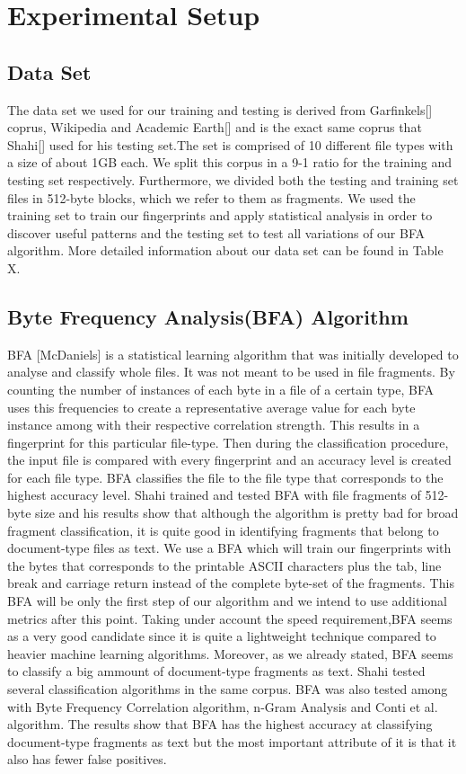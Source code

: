 \chapter{Experimental Setup}


\section{Data Set}
The data set we used for our training and testing is derived from  Garfinkels[] coprus, Wikipedia and Academic Earth[] and is the exact same coprus that Shahi[] used for his testing set.The set is comprised of 10 different file types with a size of about 1GB each. We split this corpus in a 9-1 ratio for the training and testing set respectively. 
Furthermore, we divided both the testing and training set files in 512-byte blocks, which we refer to them as fragments. We used the training set to train our fingerprints and apply statistical analysis in order to discover useful patterns and the testing set to test all variations of our BFA algorithm. More detailed information about our data set can be found in Table X.




\section{Byte Frequency Analysis(BFA) Algorithm}
BFA [McDaniels] is a statistical learning algorithm that was initially developed to analyse and classify whole files. It was not meant to be used in file fragments. By counting the number of instances of each byte in a file of a certain type, BFA uses this frequencies to create a representative average value for each byte instance among with their respective correlation strength. This results in a fingerprint for this particular file-type. Then during the classification procedure, the input file is compared with every fingerprint and an accuracy level is created for each file type. BFA classifies the file to the file type that corresponds to the highest accuracy level.
 Shahi trained and tested BFA with file fragments of 512-byte size and his results show that although the algorithm is pretty bad for broad fragment classification, it is quite good in identifying fragments that belong to document-type files as text. We use a BFA which will train our fingerprints with the bytes that corresponds to the printable ASCII characters plus the tab, line break and carriage return instead of the complete byte-set of the fragments. This BFA will be only the first step of our algorithm and we intend to use additional metrics after this point. Taking under account the speed requirement,BFA seems as a very good candidate since it is quite a lightweight technique compared to heavier machine learning algorithms. Moreover, as we already stated, BFA seems to classify a big ammount of document-type fragments as text. Shahi tested several classification algorithms in the same corpus. BFA was also tested among with Byte Frequency Correlation algorithm, n-Gram Analysis and Conti et al. algorithm. The results show that BFA has the highest accuracy at classifying document-type fragments as text but the most important attribute of it is that it also has fewer false positives.



